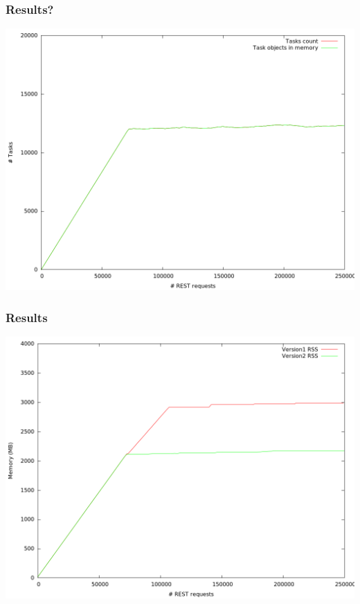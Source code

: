 \documentclass{beamer}
\begin{document}
    \begin{frame}
        \frametitle{Results?}
        \includegraphics[height=0.8\textheight]{wr_tasks.png}
    \end{frame}

    \begin{frame}
        \frametitle{Results}
        \includegraphics[height=0.8\textheight]{mem_usage.png}
    \end{frame}
\end{document}
